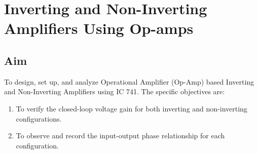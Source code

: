 
\chapter{Inverting and Non-Inverting Amplifiers Using Op-amps}

\section{Aim}
To design, set up, and analyze Operational Amplifier (Op-Amp) based Inverting and Non-Inverting Amplifiers using IC 741. The specific objectives are:
\begin{enumerate}
	\item To verify the closed-loop voltage gain for both inverting and non-inverting configurations.
	\item To observe and record the input-output phase relationship for each configuration.
\end{enumerate}


